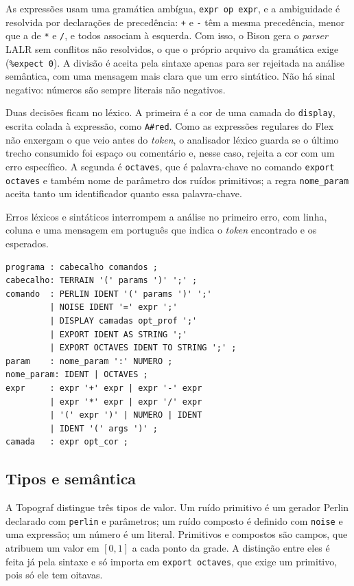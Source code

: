 \documentclass[sigconf, nonacm, screen, language=portuguese, language={main=english}]{acmart}
\begin{document}
As expressões usam uma gramática ambígua, \texttt{expr op expr}, e a
ambiguidade é resolvida por declarações de precedência:
\texttt{+} e \texttt{-} têm a mesma precedência, menor que a de
\texttt{*} e \texttt{/}, e todos associam à esquerda. Com isso, o Bison
gera o \textit{parser} LALR sem conflitos não resolvidos, o que o
próprio arquivo da gramática exige (\texttt{\%expect 0}). A divisão é
aceita pela sintaxe apenas para ser rejeitada na análise semântica, com
uma mensagem mais clara que um erro sintático. Não há sinal negativo:
números são sempre literais não negativos.

Duas decisões ficam no léxico. A primeira é a cor de uma camada do
\texttt{display}, escrita colada à expressão, como \texttt{A\#red}. Como
as expressões regulares do Flex não enxergam o que veio antes do
\textit{token}, o analisador léxico guarda se o último trecho consumido
foi espaço ou comentário e, nesse caso, rejeita a cor com um erro
específico. A segunda é \texttt{octaves}, que é palavra-chave no
comando \texttt{export octaves} e também nome de parâmetro dos
ruídos primitivos; a regra \texttt{nome\_param} aceita tanto um
identificador quanto essa palavra-chave.

Erros léxicos e sintáticos interrompem a análise no primeiro erro, com
linha, coluna e uma mensagem em português que indica o \textit{token}
encontrado e os esperados.

\begin{lstlisting}[language={}, caption={Gramática da Topograf (notação Bison, simplificada).}, label={lst:gramatica}, float=t, numbers=none]
programa : cabecalho comandos ;
cabecalho: TERRAIN '(' params ')' ';' ;
comando  : PERLIN IDENT '(' params ')' ';'
         | NOISE IDENT '=' expr ';'
         | DISPLAY camadas opt_prof ';'
         | EXPORT IDENT AS STRING ';'
         | EXPORT OCTAVES IDENT TO STRING ';' ;
param    : nome_param ':' NUMERO ;
nome_param: IDENT | OCTAVES ;
expr     : expr '+' expr | expr '-' expr
         | expr '*' expr | expr '/' expr
         | '(' expr ')' | NUMERO | IDENT
         | IDENT '(' args ')' ;
camada   : expr opt_cor ;
\end{lstlisting}

\subsection{Tipos e semântica}\label{sec:semantica}
A Topograf distingue três tipos de valor. Um ruído primitivo é um
gerador Perlin declarado com \texttt{perlin} e parâmetros; um ruído
composto é definido com \texttt{noise} e uma expressão; um número é um
literal. Primitivos e compostos são campos, que atribuem um valor em
$[0,1]$ a cada ponto da grade. A distinção entre eles é feita já pela
sintaxe e só importa em \texttt{export octaves}, que exige um
primitivo, pois só ele tem oitavas.
\end{document}
